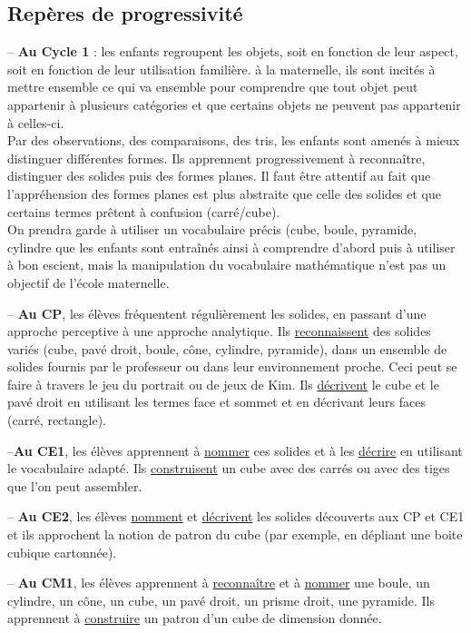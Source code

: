 \subsection{Repères de progressivité}

-- {\bf Au Cycle 1} : les enfants regroupent les objets, soit en fonction de leur aspect, soit en fonction de leur utilisation familière. à la maternelle, ils sont incités à \og mettre ensemble ce qui va ensemble \fg{} pour comprendre que tout objet peut appartenir à plusieurs catégories et que certains objets ne peuvent pas appartenir à celles-ci. \\
Par des observations, des comparaisons, des tris, les enfants sont amenés à mieux distinguer différentes formes. Ils apprennent progressivement à reconnaître, distinguer des solides puis des formes planes. Il faut être attentif au fait que l’appréhension des formes planes est plus abstraite que celle des solides et que certains termes prêtent à confusion (carré/cube). \\
On prendra garde à utiliser un vocabulaire précis (cube, boule, pyramide, cylindre que les enfants sont entraînés ainsi à comprendre d’abord puis à utiliser à bon escient, mais la manipulation du vocabulaire mathématique n’est pas un objectif de l’école maternelle.

\pagebreak


-- {\bf Au CP}, les élèves fréquentent régulièrement les solides, en passant d’une approche perceptive à une approche analytique. Ils \uline{reconnaissent} des solides variés (cube, pavé droit, boule, cône, cylindre, pyramide), dans un ensemble de solides fournis par le professeur ou dans leur environnement proche. Ceci peut se faire à travers le jeu du portrait ou de jeux de Kim. Ils \uline{décrivent} le cube et le pavé droit en utilisant les termes face et sommet et en décrivant leurs faces (carré, rectangle).

--{\bf Au CE1}, les élèves apprennent à \uline{nommer} ces solides et à les \uline{décrire} en utilisant le vocabulaire adapté. Ils \uline{construisent} un cube avec des carrés ou avec des tiges que l'on peut assembler.

-- {\bf Au CE2}, les élèves \uline{nomment} et \uline{décrivent} les solides découverts aux CP et CE1 et ils approchent la notion de patron du cube (par exemple, en dépliant une boite cubique cartonnée).

-- {\bf Au CM1}, les élèves apprennent à \uline{reconnaître} et à \uline{nommer} une boule, un cylindre, un cône, un cube, un pavé droit, un prisme droit, une pyramide. Ils apprennent à \uline{construire} un patron d’un cube de dimension donnée. 

